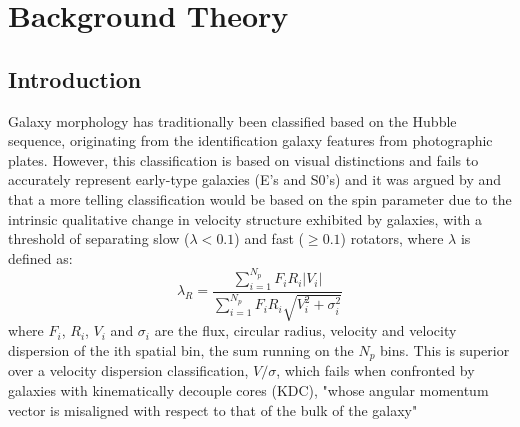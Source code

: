 
\chapter{Background Theory}

\label{ch:background}

\section{Introduction}
Galaxy morphology has traditionally been classified based on the Hubble sequence, originating from the identification galaxy features from photographic plates. However, this classification is based on visual distinctions and fails to accurately represent early-type galaxies (E's and S0's) and it was argued by \cite{Cappellari2011} and \cite{Emsellem2011} that a more telling classification would be based on the spin parameter due to the intrinsic qualitative change in velocity structure exhibited by galaxies, with a threshold of separating slow ($\lambda<0.1$) and fast ($\geq0.1$) rotators, where $\lambda$ is defined as\cite{sauron9}:
\begin{equation}
\lambda_{R} = \frac{\sum_{i=1}^{N_{p}} F_{i}R_{i}|V_{i}|}{\sum_{i=1}^{N_{p}}F_{i}R_{i}\sqrt{V_{i}^2+\sigma_{i}^2}}
\end{equation}
where $F_i$, $R_i$, $V_i$ and $σ_i$ are the flux, circular radius, velocity and velocity dispersion of the ith spatial bin, the sum running on the $N_p$ bins.
This is superior over a velocity dispersion classification, $V/\sigma$, which fails when confronted by galaxies with kinematically decouple cores (KDC), "whose angular momentum vector is misaligned with respect to that of the bulk of the galaxy" \cite{mo_bosch_white_2010}

